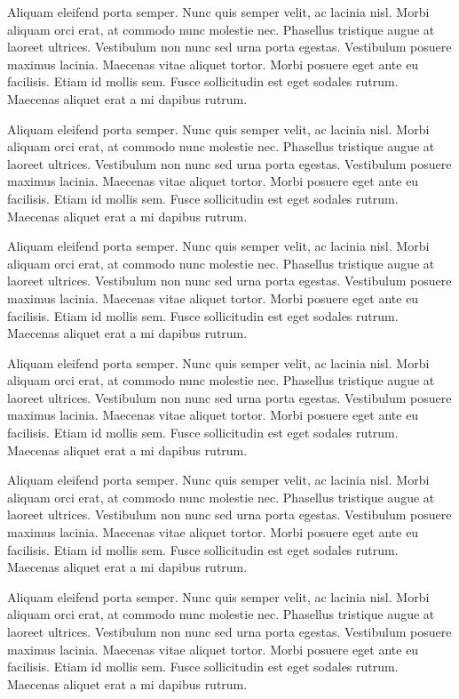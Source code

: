 Aliquam eleifend porta semper. Nunc quis semper velit, ac lacinia nisl. Morbi aliquam orci erat, at commodo nunc molestie nec. Phasellus tristique augue at laoreet ultrices. Vestibulum non nunc sed urna porta egestas. Vestibulum posuere maximus lacinia. Maecenas vitae aliquet tortor. Morbi posuere eget ante eu facilisis. Etiam id mollis sem. Fusce sollicitudin est eget sodales rutrum. Maecenas aliquet erat a mi dapibus rutrum.

Aliquam eleifend porta semper. Nunc quis semper velit, ac lacinia nisl. Morbi aliquam orci erat, at commodo nunc molestie nec. Phasellus tristique augue at laoreet ultrices. Vestibulum non nunc sed urna porta egestas. Vestibulum posuere maximus lacinia. Maecenas vitae aliquet tortor. Morbi posuere eget ante eu facilisis. Etiam id mollis sem. Fusce sollicitudin est eget sodales rutrum. Maecenas aliquet erat a mi dapibus rutrum.

Aliquam eleifend porta semper. Nunc quis semper velit, ac lacinia nisl. Morbi aliquam orci erat, at commodo nunc molestie nec. Phasellus tristique augue at laoreet ultrices. Vestibulum non nunc sed urna porta egestas. Vestibulum posuere maximus lacinia. Maecenas vitae aliquet tortor. Morbi posuere eget ante eu facilisis. Etiam id mollis sem. Fusce sollicitudin est eget sodales rutrum. Maecenas aliquet erat a mi dapibus rutrum.

Aliquam eleifend porta semper. Nunc quis semper velit, ac lacinia nisl. Morbi aliquam orci erat, at commodo nunc molestie nec. Phasellus tristique augue at laoreet ultrices. Vestibulum non nunc sed urna porta egestas. Vestibulum posuere maximus lacinia. Maecenas vitae aliquet tortor. Morbi posuere eget ante eu facilisis. Etiam id mollis sem. Fusce sollicitudin est eget sodales rutrum. Maecenas aliquet erat a mi dapibus rutrum.

Aliquam eleifend porta semper. Nunc quis semper velit, ac lacinia nisl. Morbi aliquam orci erat, at commodo nunc molestie nec. Phasellus tristique augue at laoreet ultrices. Vestibulum non nunc sed urna porta egestas. Vestibulum posuere maximus lacinia. Maecenas vitae aliquet tortor. Morbi posuere eget ante eu facilisis. Etiam id mollis sem. Fusce sollicitudin est eget sodales rutrum. Maecenas aliquet erat a mi dapibus rutrum.

Aliquam eleifend porta semper. Nunc quis semper velit, ac lacinia nisl. Morbi aliquam orci erat, at commodo nunc molestie nec. Phasellus tristique augue at laoreet ultrices. Vestibulum non nunc sed urna porta egestas. Vestibulum posuere maximus lacinia. Maecenas vitae aliquet tortor. Morbi posuere eget ante eu facilisis. Etiam id mollis sem. Fusce sollicitudin est eget sodales rutrum. Maecenas aliquet erat a mi dapibus rutrum.

